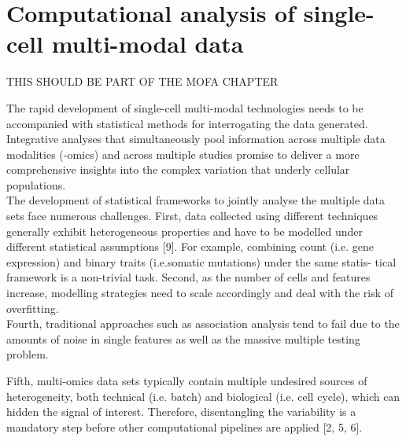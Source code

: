 \section{Computational analysis of single-cell multi-modal data}
THIS SHOULD BE PART OF THE MOFA CHAPTER

The rapid development of single-cell multi-modal technologies needs to be accompanied with statistical methods for interrogating the data generated. Integrative analyses that simultaneously pool information across multiple data modalities (-omics) and across multiple studies promise to deliver a more comprehensive insights into the complex variation that underly cellular populations.\\
The development of statistical frameworks to jointly analyse the multiple data sets face numerous challenges. First, data collected using different techniques generally exhibit heterogeneous properties and have to be modelled under different statistical assumptions [9]. For example, combining count (i.e. gene expression) and binary traits (i.e.somatic mutations) under the same statis- tical framework is a non-trivial task. Second, as the number of cells and features increase, modelling strategies need to scale accordingly and deal with the risk of overfitting.\\


Fourth, traditional approaches such as association analysis tend to fail due to the amounts of noise in single features as well as the massive multiple testing problem. 

Fifth, multi-omics data sets typically contain multiple undesired sources of heterogeneity, both technical (i.e. batch) and biological (i.e. cell cycle), which can hidden the signal of interest. Therefore, disentangling the variability is a mandatory step before other computational pipelines are applied [2, 5, 6].

